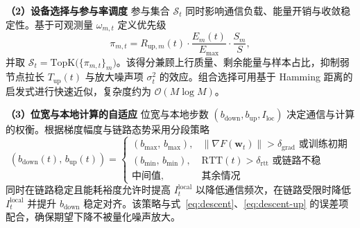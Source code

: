 \textbf{（2）设备选择与参与率调度}
参与集合 $\mathcal S_t$ 同时影响通信负载、能量开销与收敛稳定性。基于可观测量 $\omega_{m,t}$ 定义优先级
\begin{equation}
	\label{eq:device-score}
	\pi_{m,t}=R_{\text{up},m}(t)\cdot \frac{E_m(t)}{E_{\max}}\cdot \frac{S_m}{S},
\end{equation}
并取 $\mathcal S_t=\mathrm{TopK}\big(\{\pi_{m,t}\}_m\big)$。该得分兼顾上行质量、剩余能量与样本占比，抑制弱节点拉长 $T_{\text{up}}(t)$ 与放大噪声项 $\sigma_t^2$ 的效应。组合选择可用基于 Hamming 距离的启发式进行快速近似，复杂度约为 $\mathcal O(M\log M)$。

\textbf{（3）位宽与本地计算的自适应}
位宽与本地步数 $(b_{\text{down}},b_{\text{up}},I_{\text{loc}})$ 决定通信与计算的权衡。根据梯度幅度与链路态势采用分段策略
\begin{equation}
	\label{eq:bit-policy}
	(b_{\text{down}}(t),\,b_{\text{up}}(t))=
	\begin{cases}
		(b_{\max},\,b_{\max}), & \|\nabla F(\mathbf{w}_t)\|>\delta_{\text{grad}} \text{ 或训练初期}\\
		(b_{\min},\,b_{\min}), & \mathrm{RTT}(t)>\delta_{\text{rtt}} \text{ 或链路不稳}\\
		\text{中间值}, & \text{其余情况}
	\end{cases}
\end{equation}
同时在链路稳定且能耗裕度允许时提高 $I^{\text{local}}_t$ 以降低通信频次，在链路受限时降低 $I^{\text{local}}_t$ 并提升 $b_{\text{down}}$ 稳定对齐。该策略与式~\eqref{eq:descent}、\eqref{eq:descent-up} 的误差项配合，确保期望下降不被量化噪声放大。

